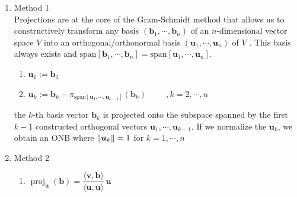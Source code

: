 \begin{enumerate}
    \item Method 1
    \hfill \cite{mfml/book/mml/Deisenroth-Faisal-Ong}
    \\
    Projections are at the core of the Gram-Schmidt method that allows us to constructively transform any basis $(\bm{b}_1, \cdots , \bm{b}_n)$ of an $n$-dimensional vector space $V$ into an orthogonal/orthonormal basis $(\bm{u}_1, \cdots ,\bm{u}_n)$ of $V$ .
    This basis always exists and $\text{span}[\bm{b}_1, \cdots , \bm{b}_n] = \text{span}[\bm{u}_1, \cdots , \bm{u}_n]$.
    \hfill \cite{mfml/book/mml/Deisenroth-Faisal-Ong}
    \begin{enumerate}
        \item $\bm{u}_1 := \bm{b}_1$
        \hfill \cite{mfml/book/mml/Deisenroth-Faisal-Ong}

        \item $
            \bm{u}_k := \bm{b}_k - \pi_{\text{span}[\bm{u}_1,\cdots,\bm{u}_{k-1}]}(\bm{b}_k)
            \hspace{1cm}
            ,k = 2, \cdots , n
        $
        \hfill \cite{mfml/book/mml/Deisenroth-Faisal-Ong}
    \end{enumerate}
    the $k$-th basis vector $\bm{b}_k$ is projected onto the subspace spanned by the first $k - 1$ constructed orthogonal vectors $\bm{u}_1, \cdots ,\bm{u}_{k-1}$.
    If we normalize the $\bm{u}_k$, we obtain an ONB where $\left\| \bm{u}_k \right\| = 1$ for $k = 1, \cdots , n$


    \item Method 2
    \hfill \cite{wiki/Gram-Schmidt_process}
    \begin{enumerate}
        \item ${
            \displaystyle
            \operatorname {proj} _{\mathbf {u} }(\mathbf {b} )
            ={\dfrac {\langle \mathbf {v} ,\mathbf {b} \rangle }{\langle \mathbf {u} ,\mathbf {u} \rangle }}
            \,\mathbf {u}
        }$
        \hfill \cite{wiki/Gram-Schmidt_process}


\end{enumerate}
\end{enumerate}
